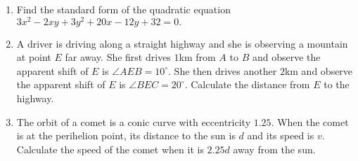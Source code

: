 \documentclass{article}
\begin{document}
\begin{enumerate}
\begin{figure}[ht]
  \end{figure}

\item Find the standard form of the quadratic equation $3x^2 - 2xy + 3y^2 + 20x -12y +32 = 0.$
\newpage
\item A driver is driving along a straight highway and she is observing a mountain at point $E$ far away. She first drives $1$km from $A$ to $B$ and observe the apparent shift of $E$ is $\angle AEB = 10^\circ$. She then drives another $2$km and observe the apparent shift of $E$ is $\angle BEC = 20^\circ$. Calculate the distance from $E$ to the highway.

  \begin{figure}[ht]
    \centering
  \end{figure}


\item The orbit of a comet is a conic curve with eccentricity $1.25$. When the comet is at the perihelion point, its distance to the sun is $d$ and its speed is $v$. Calculate the speed of the comet when it is $2.25d$ away from the sun.
\end{enumerate}
\end{document}
